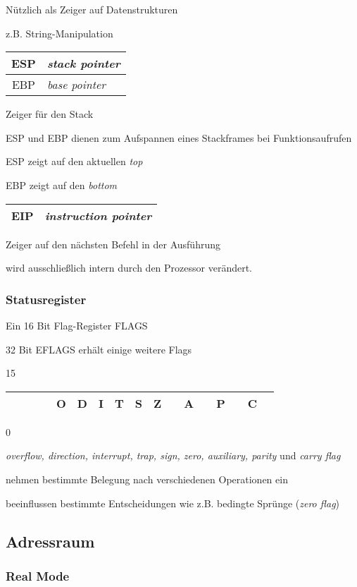 Nützlich als Zeiger auf Datenstrukturen

z.B. String-Manipulation


\begin{tabular}{|c|l|}
\hline ESP & \emph{stack pointer}\\
\hline EBP & \emph{base pointer} \\
\hline
\end{tabular}

Zeiger für den Stack

ESP und EBP dienen zum Aufspannen eines Stackframes bei Funktionsaufrufen

ESP zeigt auf den aktuellen \emph{top}

EBP zeigt auf den \emph{bottom}

\begin{tabular}{|c|l|}
\hline EIP & \emph{instruction pointer} \\
\hline
\end{tabular}

Zeiger auf den nächsten Befehl in der Ausführung

wird ausschließlich intern durch den Prozessor verändert.

\subsubsection{Statusregister}

Ein 16 Bit Flag-Register FLAGS

32 Bit EFLAGS erhält einige weitere Flags

{\small 15}
\begin{tabular}{|c|c|c|c|c|c|c|c|c|c|c|c|c|c|c|c|c|}
\hline & & & & O & D & I & T & S & Z & & A & & P & & C \\
\hline
\end{tabular}
{\small 0}

\emph{overflow, direction, interrupt, trap, sign, zero, auxiliary, parity}
und \emph{carry flag} 

nehmen bestimmte Belegung nach verschiedenen Operationen ein

beeinflussen bestimmte Entscheidungen wie z.B. bedingte Sprünge (\emph{zero flag})


\subsection{Adressraum}

\subsubsection{Real Mode}


